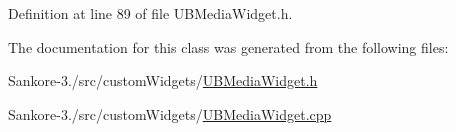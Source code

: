 Definition at line 89 of file U\-B\-Media\-Widget.\-h.



The documentation for this class was generated from the following files\-:\begin{DoxyCompactItemize}
\item 
Sankore-\/3./src/custom\-Widgets/\hyperlink{_u_b_media_widget_8h}{U\-B\-Media\-Widget.\-h}\item 
Sankore-\/3./src/custom\-Widgets/\hyperlink{_u_b_media_widget_8cpp}{U\-B\-Media\-Widget.\-cpp}\end{DoxyCompactItemize}
